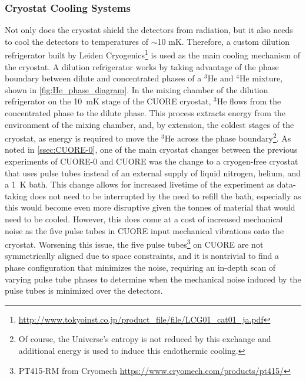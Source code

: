 \subsubsection*{Cryostat Cooling Systems}
\label{sssec:Cooling Systems}
Not only does the cryostat shield the detectors from radiation, but it also needs to cool the detectors to temperatures of $\sim$10 mK.
Therefore, a custom dilution refrigerator built by Leiden Cryogenics\footnote{\RaggedRight\url{http://www.tokyoinst.co.jp/product_file/file/LCG01_cat01_ja.pdf}} is used as the main cooling mechanism of the cryostat.
A dilution refrigerator works by taking advantage of the phase boundary between dilute and concentrated phases of a $^3$He and $^4$He mixture, shown in \autoref{fig:He_phase_diagram}.
In the mixing chamber of the dilution refrigerator on the 10~mK stage of the CUORE cryostat, $^3$He flows from the concentrated phase to the dilute phase.
This process extracts energy from the environment of the mixing chamber, and, by extension, the coldest stages of the cryostat, as energy is required to move the $^3$He across the phase boundary\footnote{Of course, the Universe's entropy is not reduced by this exchange and additional energy is used to induce this endothermic cooling.}.
As noted in \autoref{ssec:CUORE-0}, one of the main cryostat changes between the previous experiments of CUORE-0 and CUORE was the change to a cryogen-free cryostat that uses pulse tubes instead of an external supply of liquid nitrogen, helium, and a 1~K bath.
This change allows for increased livetime of the experiment as data-taking does not need to be interrupted by the need to refill the bath, especially as this would become even more disruptive given the tonnes of material that would need to be cooled.
However, this does come at a cost of increased mechanical noise as the five pulse tubes in CUORE input mechanical vibrations onto the cryostat.
Worsening this issue, the five pulse tubes\footnote{PT415-RM from Cryomech \url{https://www.cryomech.com/products/pt415/}} on CUORE are not symmetrically aligned due to space constraints, and it is nontrivial to find a phase configuration that minimizes the noise, requiring an in-depth scan of varying pulse tube phases to determine when the mechanical noise induced by the pulse tubes is minimized over the detectors.


